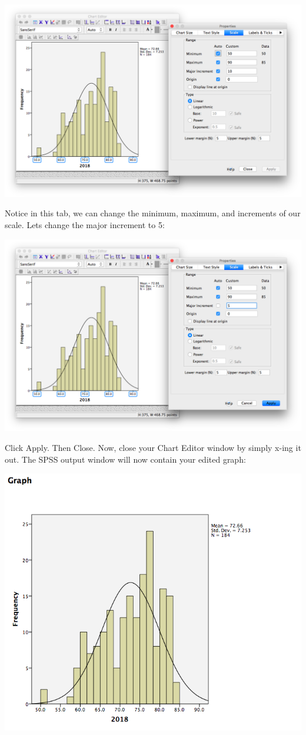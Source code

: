 \documentclass[
]{book}
\begin{document}
\includegraphics{img/2.4.26.png}

Notice in this tab, we can change the minimum, maximum, and increments of our scale. Lets change the major increment to 5:

\includegraphics{img/2.4.27.png}

Click {Apply}. Then {Close}. Now, close your Chart Editor window by simply {x}-ing it out. The SPSS output window will now contain your edited graph:

\includegraphics{img/2.4.28.png}
\end{document}
